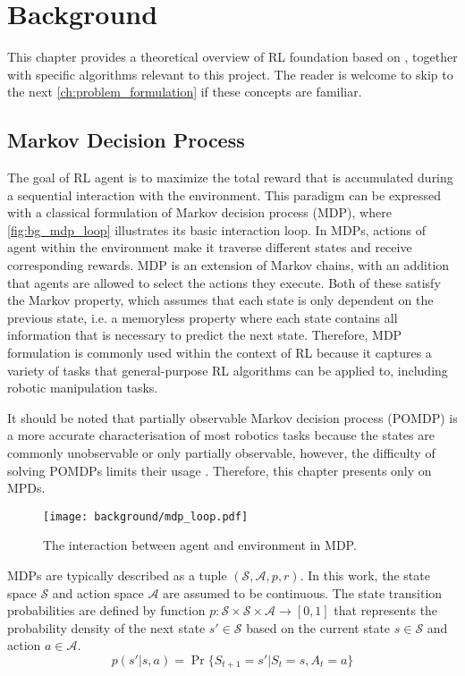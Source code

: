 \chapter{Background}\label{ch:background}

This chapter provides a theoretical overview of RL foundation based on \citet{sutton_reinforcement_2018}, together with specific algorithms relevant to this project. The reader is welcome to skip to the next \autoref{ch:problem_formulation} if these concepts are familiar.


\section{Markov Decision Process}

The goal of RL agent is to maximize the total reward that is accumulated during a sequential interaction with the environment. This paradigm can be expressed with a classical formulation of Markov decision process (MDP), where \autoref{fig:bg_mdp_loop} illustrates its basic interaction loop. In MDPs, actions of agent within the environment make it traverse different states and receive corresponding rewards. MDP is an extension of Markov chains, with an addition that agents are allowed to select the actions they execute. Both of these satisfy the Markov property, which assumes that each state is only dependent on the previous state, i.e. a memoryless property where each state contains all information that is necessary to predict the next state. Therefore, MDP formulation is commonly used within the context of RL because it captures a variety of tasks that general-purpose RL algorithms can be applied to, including robotic manipulation tasks.

It should be noted that partially observable Markov decision process (POMDP) is a more accurate characterisation of most robotics tasks because the states are commonly unobservable or only partially observable, however, the difficulty of solving POMDPs limits their usage \cite{kroemer_review_2021}. Therefore, this chapter presents only on MPDs.

\begin{figure}[ht]
    \centering
    \texttt{[image: background/mdp\_loop.pdf]}
    \caption{The interaction between agent and environment in MDP.~\protect\cite{sutton_reinforcement_2018}}
    \label{fig:bg_mdp_loop}
\end{figure}

MDPs are typically described as a tuple \((\mathcal{S}, \mathcal{A}, p, r)\). In this work, the state space \(\mathcal{S}\) and action space \(\mathcal{A}\) are assumed to be continuous. The state transition probabilities are defined by function \(p : \mathcal{S} \times \mathcal{S} \times \mathcal{A} \rightarrow [0, 1]\) that represents the probability density of the next state \(s' \in \mathcal{S}\) based on the current state \(s \in \mathcal{S}\) and action \(a \in \mathcal{A}\).
\begin{equation}
    p(s' \vert s, a) = \Pr\{S_{t+1}{=}s' \vert S_t{=}s, A_{t}{=}a\}
\end{equation}

